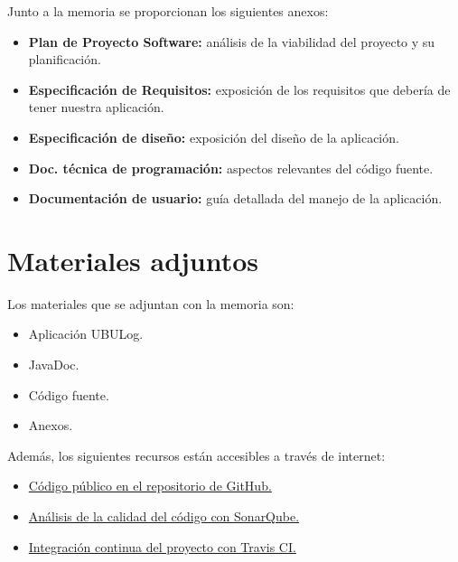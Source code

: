 Junto a la memoria se proporcionan los siguientes anexos:

\begin{itemize}
	\tightlist
	\item
	\textbf{Plan de Proyecto Software:} análisis de la viabilidad del proyecto y su planificación.
	\item
	\textbf{Especificación de Requisitos:} exposición de los requisitos que debería de tener nuestra aplicación.
	\item
	\textbf{Especificación de diseño:} exposición del diseño de la aplicación.
	\item
	\textbf{Doc. técnica de programación:} aspectos relevantes del código fuente.
	\item
	\textbf{Documentación de usuario:} guía detallada del manejo de la aplicación.
\end{itemize}

\section{Materiales adjuntos}\label{materiales-adjuntos}

Los materiales que se adjuntan con la memoria son: 

\begin{itemize}
	\tightlist
	\item
	Aplicación UBULog.
	\item
	JavaDoc.
	\item
	Código fuente.
	\item
	Anexos.
\end{itemize}

Además, los siguientes recursos están accesibles a través de internet:

\begin{itemize}
	\tightlist
	\item
	\href{https://github.com/trona85/GII-17.1B-UBULog-1.0}{Código público en el repositorio de GitHub.}
	\item
	\href{https://sonarcloud.io/dashboard?id=GII-17.1B-UBULog-1.0}{Análisis de la calidad del código con SonarQube.}
	\item
	\href{https://travis-ci.org/trona85/GII-17.1B-UBULog-1.0/}{Integración continua del proyecto con Travis CI.}
	
\end{itemize}



